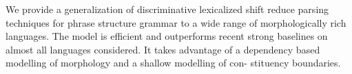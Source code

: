 We provide a generalization of discriminative lexicalized shift reduce parsing techniques for phrase structure grammar to a wide range of morphologically rich languages. The model is efficient and outperforms recent strong baselines on almost all languages considered. It takes advantage of a dependency based modelling of morphology and a shallow modelling of con- stituency boundaries.
